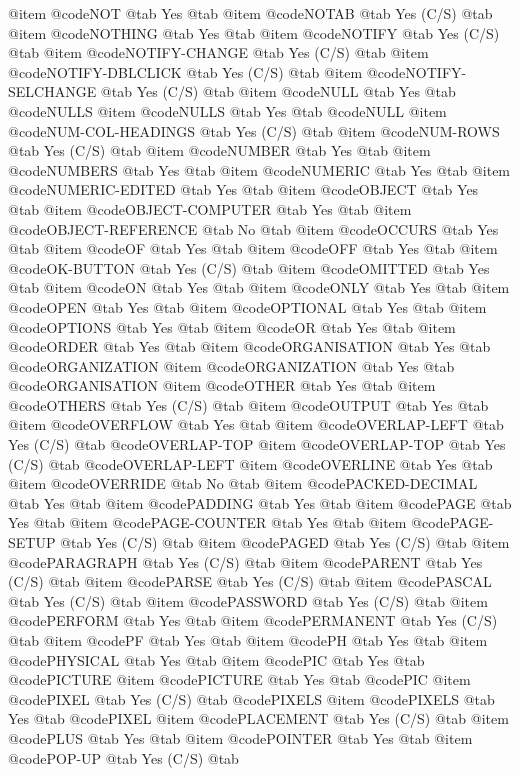 @item @code{NOT} @tab Yes @tab 
@item @code{NOTAB} @tab Yes	(C/S) @tab 
@item @code{NOTHING} @tab Yes @tab 
@item @code{NOTIFY} @tab Yes	(C/S) @tab 
@item @code{NOTIFY-CHANGE} @tab Yes	(C/S) @tab 
@item @code{NOTIFY-DBLCLICK} @tab Yes	(C/S) @tab 
@item @code{NOTIFY-SELCHANGE} @tab Yes	(C/S) @tab 
@item @code{NULL} @tab Yes @tab @code{NULLS}
@item @code{NULLS} @tab Yes @tab @code{NULL}
@item @code{NUM-COL-HEADINGS} @tab Yes	(C/S) @tab 
@item @code{NUM-ROWS} @tab Yes	(C/S) @tab 
@item @code{NUMBER} @tab Yes @tab 
@item @code{NUMBERS} @tab Yes @tab 
@item @code{NUMERIC} @tab Yes @tab 
@item @code{NUMERIC-EDITED} @tab Yes @tab 
@item @code{OBJECT} @tab Yes @tab 
@item @code{OBJECT-COMPUTER} @tab Yes @tab 
@item @code{OBJECT-REFERENCE} @tab No @tab 
@item @code{OCCURS} @tab Yes @tab 
@item @code{OF} @tab Yes @tab 
@item @code{OFF} @tab Yes @tab 
@item @code{OK-BUTTON} @tab Yes	(C/S) @tab 
@item @code{OMITTED} @tab Yes @tab 
@item @code{ON} @tab Yes @tab 
@item @code{ONLY} @tab Yes @tab 
@item @code{OPEN} @tab Yes @tab 
@item @code{OPTIONAL} @tab Yes @tab 
@item @code{OPTIONS} @tab Yes @tab 
@item @code{OR} @tab Yes @tab 
@item @code{ORDER} @tab Yes @tab 
@item @code{ORGANISATION} @tab Yes @tab @code{ORGANIZATION}
@item @code{ORGANIZATION} @tab Yes @tab @code{ORGANISATION}
@item @code{OTHER} @tab Yes @tab 
@item @code{OTHERS} @tab Yes	(C/S) @tab 
@item @code{OUTPUT} @tab Yes @tab 
@item @code{OVERFLOW} @tab Yes @tab 
@item @code{OVERLAP-LEFT} @tab Yes	(C/S) @tab @code{OVERLAP-TOP}
@item @code{OVERLAP-TOP} @tab Yes	(C/S) @tab @code{OVERLAP-LEFT}
@item @code{OVERLINE} @tab Yes @tab 
@item @code{OVERRIDE} @tab No @tab 
@item @code{PACKED-DECIMAL} @tab Yes @tab 
@item @code{PADDING} @tab Yes @tab 
@item @code{PAGE} @tab Yes @tab 
@item @code{PAGE-COUNTER} @tab Yes @tab 
@item @code{PAGE-SETUP} @tab Yes	(C/S) @tab 
@item @code{PAGED} @tab Yes	(C/S) @tab 
@item @code{PARAGRAPH} @tab Yes	(C/S) @tab 
@item @code{PARENT} @tab Yes	(C/S) @tab 
@item @code{PARSE} @tab Yes	(C/S) @tab 
@item @code{PASCAL} @tab Yes	(C/S) @tab 
@item @code{PASSWORD} @tab Yes	(C/S) @tab 
@item @code{PERFORM} @tab Yes @tab 
@item @code{PERMANENT} @tab Yes	(C/S) @tab 
@item @code{PF} @tab Yes @tab 
@item @code{PH} @tab Yes @tab 
@item @code{PHYSICAL} @tab Yes @tab 
@item @code{PIC} @tab Yes @tab @code{PICTURE}
@item @code{PICTURE} @tab Yes @tab @code{PIC}
@item @code{PIXEL} @tab Yes	(C/S) @tab @code{PIXELS}
@item @code{PIXELS} @tab Yes @tab @code{PIXEL}
@item @code{PLACEMENT} @tab Yes	(C/S) @tab 
@item @code{PLUS} @tab Yes @tab 
@item @code{POINTER} @tab Yes @tab 
@item @code{POP-UP} @tab Yes	(C/S) @tab 
